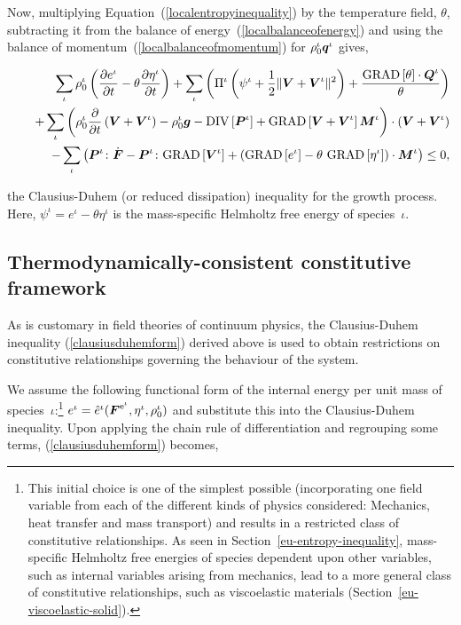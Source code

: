 Now, multiplying Equation~(\ref{localentropyinequality}) by the
temperature field, $\theta$, subtracting it from the balance of
energy~(\ref{localbalanceofenergy}) and using the balance of
momentum~(\ref{localbalanceofmomentum}) for $\rho_0^\iota\mbox{\boldmath$ q$}^\iota$
gives,

\begin{eqnarray}
& &\sum\limits_{\iota}\rho^\iota_0\left(\frac{\partial
e^\iota}{\partial t} -\theta\frac{\partial\eta^\iota}{\partial
t}\right) +\sum\limits_{\iota}\left(\Pi^\iota\left(\psi^\iota +
\frac{1}{2}\Vert\mbox{\boldmath$ V$}+\mbox{\boldmath$ V$}^\iota\Vert^2\right) +
\frac{\mathrm{GRAD}\left[\theta\right]\cdot\mbox{\boldmath$ Q$}^\iota}{\theta}\right)
\nonumber\\
& &+\sum\limits_{\iota} \left(\rho^\iota_0\frac{\partial}{\partial
t}\left(\mbox{\boldmath$ V$}+\mbox{\boldmath$ V$}^\iota\right) - \rho_0^\iota\mbox{\boldmath$ g$} -
\mathrm{DIV}\left[\mbox{\boldmath$ P$}^\iota\right] +
\mathrm{GRAD}\left[\mbox{\boldmath$ V$}+\mbox{\boldmath$ V$}^\iota\right]\mbox{\boldmath$ M$}^\iota\right)
\cdot\left(\mbox{\boldmath$ V$}+\mbox{\boldmath$ V$}^\iota\right)\nonumber\\
\quad &  &\quad -\sum\limits_{\iota}\left(\mbox{\boldmath$ P$}^\iota\colon\dot{\mbox{\boldmath$ F$}} -
\mbox{\boldmath$ P$}^\iota\colon\mathrm{GRAD}\left[\mbox{\boldmath$ V$}^\iota\right] +
\left(\mathrm{GRAD}\left[e^\iota\right] - 
\theta\ \mathrm{GRAD}\left[\eta^\iota\right]\right)
\cdot\mbox{\boldmath$ M$}^\iota\right)\leq 0,
\label{clausiusduhemform}
\end{eqnarray}

\noindent the Clausius-Duhem (or reduced dissipation) inequality for
the growth process. Here, \mbox{$\psi^\iota = e^\iota -
  \theta\eta^\iota$} is the mass-specific Helmholtz free energy of
species~$\iota$.

\subsection{Thermodynamically-consistent constitutive framework}
\label{constitutive-framework}

As is customary in field theories of continuum physics, the
Clausius-Duhem inequality (\ref{clausiusduhemform}) derived above is
used to obtain restrictions on constitutive relationships governing
the behaviour of the system.

We assume the following functional form of the internal energy per
unit mass of species~$\iota$:\footnote{This initial choice is one of
  the simplest possible (incorporating one field variable from each of
  the different kinds of physics considered: Mechanics, heat transfer
  and mass transport) and results in a restricted class of
  constitutive relationships. As seen in
  Section~\ref{eu-entropy-inequality}, mass-specific Helmholtz
  free energies of species dependent upon other variables, such as
  internal variables arising from mechanics, lead to a more general
  class of constitutive relationships, such as viscoelastic materials
  (Section~\ref{eu-viscoelastic-solid}).} $e^{\iota} =
\hat{e}^\iota(\mbox{\boldmath$ F$}^{\mathrm{e}^\iota}, \eta^{\iota}, \rho_0^\iota)$ and
substitute this into the Clausius-Duhem inequality. Upon applying the
chain rule of differentiation and regrouping some terms,
(\ref{clausiusduhemform}) becomes,

